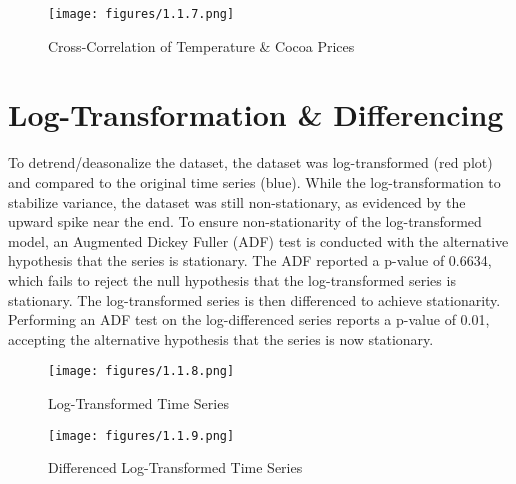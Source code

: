 \begin{figure}[!ht]
    \centering
    \texttt{[image: figures/1.1.7.png]}
    \caption{Cross-Correlation of Temperature \& Cocoa Prices}
    \label{fig:chart_a}
\end{figure}




\section{Log-Transformation \& Differencing}
To detrend/deasonalize the dataset, the dataset was log-transformed (red plot) and compared to the original time series (blue). While the log-transformation to stabilize variance, the dataset was still non-stationary, as evidenced by the upward spike near the end. To ensure non-stationarity of the log-transformed model, an Augmented Dickey Fuller (ADF) test is conducted with the alternative hypothesis that the series is stationary. The ADF reported a p-value of 0.6634, which fails to reject the null hypothesis that the log-transformed series is stationary. The log-transformed series is then differenced to achieve stationarity. Performing an ADF test on the log-differenced series reports a p-value of 0.01, accepting the alternative hypothesis that the series is now stationary.

\begin{figure}[!ht]
    \centering
    \texttt{[image: figures/1.1.8.png]}
    \caption{Log-Transformed Time Series}
    \label{fig:chart_a}
\end{figure}
\begin{figure}[!ht]
    \centering
    \texttt{[image: figures/1.1.9.png]}
    \caption{Differenced Log-Transformed Time Series}
    \label{fig:chart_a}
\end{figure}

